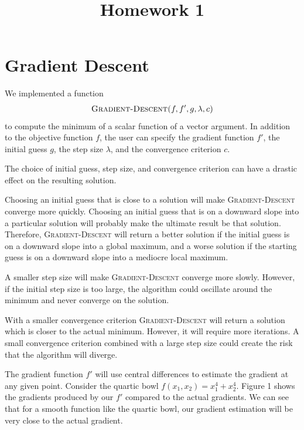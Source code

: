 \documentclass{sigchi}
\begin{document}
\title{Homework 1}


\maketitle

\large

\section{Gradient Descent}

We implemented a function
\[\textsc{Gradient-Descent($f, f', g, \lambda, c$)}\]
to compute the minimum of a scalar function of a vector argument. In addition to the objective function $f$, the user can specify the gradient function $f'$, the initial guess $g$, the step size $\lambda$, and the convergence criterion $c$.

The choice of initial guess, step size, and convergence criterion can have a drastic effect on the resulting solution.

Choosing an initial guess that is close to a solution will make \textsc{Gradient-Descent} converge more quickly. Choosing an initial guess that is on a downward slope into a particular solution will probably make the ultimate result be that solution. Therefore, \textsc{Gradient-Descent} will return a better solution if the initial guess is on a downward slope into a global maximum, and a worse solution if the starting guess is on a downward slope into a mediocre local maximum.

A smaller step size will make \textsc{Gradient-Descent} converge more slowly. However, if the initial step size is too large, the algorithm could oscillate around the minimum and never converge on the solution.

With a smaller convergence criterion \textsc{Gradient-Descent} will return a solution which is closer to the actual minimum. However, it will require more iterations. A small convergence criterion combined with a large step size could create the risk that the algorithm will diverge.

The gradient function $f'$ will use central differences to estimate the gradient at any given point. Consider the quartic bowl $f(x_1, x_2) = x_1^4 + x_2^4$. Figure 1 shows the gradients produced by our $f'$ compared to the actual gradients. We can see that for a smooth function like the quartic bowl, our gradient estimation will be very close to the actual gradient.
\end{document}
